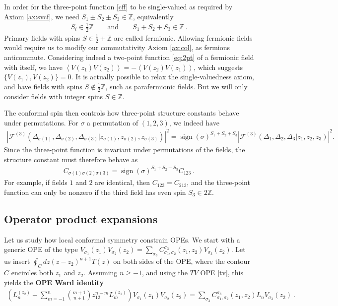 \documentclass[12pt, a4paper, notitlepage, twoside]{report}
\numberwithin{equation}{section}
\theoremstyle{break}
\begin{document}
In order for the three-point function \eqref{cff} to be single-valued as required by Axiom \ref{ax:svcf}, we need $S_1\pm S_2\pm S_3 \in\mathbb{Z}$, equivalently
\begin{align}
 \boxed{S_i \in \frac12{\mathbb{Z}} \qquad \text{and} \qquad S_1+S_2+S_3\in\mathbb{Z}}\ .
\label{dbdz}
\end{align}
Primary fields with spins $S\in\frac12+\mathbb{Z}$ are called fermionic. Allowing fermionic fields would require us to modify our commutativity Axiom \ref{ax:col}, as fermions anticommute. Considering indeed a two-point function \eqref{eq:2pt} of a fermionic field with itself, we have $\left< V(z_1)V(z_2)\right> = -\left<V(z_2)V(z_1)\right>$, which suggests $\{V(z_1),V(z_2)\}=0$.
It is actually possible to relax the single-valuedness axiom, and have fields with spins $S\notin \frac12\mathbb{Z}$, such as parafermionic fields. But we will only consider fields with integer spins $S\in\mathbb{Z}$.

The conformal spin then controls how three-point structure constants behave under permutations. For $\sigma$ a permutation of $(1,2,3)$, we indeed have 
\begin{align}
 \left|\mathcal{F}^{(3)}(\Delta_{\sigma(1)},\Delta_{\sigma(2)},\Delta_{\sigma(3)}|z_{\sigma(1)},z_{\sigma(2)},z_{\sigma(3)})\right|^2 = \operatorname{sign}(\sigma)^{S_1+S_2+S_3} \left|\mathcal{F}^{(3)}(\Delta_1,\Delta_2,\Delta_3|z_1,z_2,z_3)\right|^2 .
\end{align}
Since the three-point function is invariant under permutations of the fields, the structure constant must therefore behave as 
\begin{align}
 \boxed{ C_{\sigma(1)\sigma(2)\sigma(3)} = \operatorname{sign}(\sigma)^{S_1+S_2+S_3} C_{123} }\ .
 \label{css}
\end{align}
For example, if fields $1$ and $2$ are identical, then $C_{123}=C_{213}$, and the three-point function can only be nonzero if the third field has even spin $S_3\in 2\mathbb{Z}$.


\subsection{Operator product expansions \label{secope}}

Let us study how local conformal symmetry constrain OPEs. We start with a generic OPE of the type $V_{\sigma_1}(z_1)V_{\sigma_2}(z_2) = \sum_{\sigma_3} C_{\sigma_1,\sigma_2}^{\sigma_3}(z_1,z_2) V_{\sigma_3}(z_2)$. Let us insert $\oint_C dz (z-z_2)^{n+1} T(z)$ on both sides of the OPE, where the contour $C$ encircles both $z_1$ and $z_2$. Assuming $n\geq -1$, and using the $TV$ OPE \eqref{tv}, this yields the \textbf{OPE Ward identity}
\begin{align}
 \left(L_n^{(z_2)}+\sum_{m=-1}^{n}\binom{m+1}{n+1} z_{12}^{n-m}L_{m}^{(z_1)}\right)V_{\sigma_1}(z_1)V_{\sigma_2}(z_2) = \sum_{\sigma_3} C_{\sigma_1,\sigma_2}^{\sigma_3}(z_1,z_2) L_n V_{\sigma_3}(z_2)\ .
\end{align}
\end{document}
